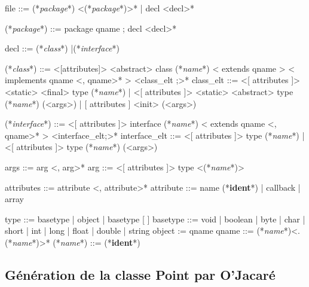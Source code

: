 \documentclass[a4paper, 11pt]{article}
\newcommand{\class}{\ttfamily\textit{class}}
\newcommand{\interface}{\ttfamily\textit{interface}}
\newcommand{\name}{\ttfamily\textit{name}}
\newcommand{\package}{\ttfamily\textit{package}}
\newcommand{\ident}{\footnotesize\textbf{ident}}
\begin{document}
\begin{idl}
file ::= (*\package*) <(*\package*)>*
  	| decl <decl>*
 
(*\package*) ::= package qname ; decl <decl>*

decl ::= (*\class*)
  	|(*\interface*)
 
(*\class*) ::= <[attributes]> <abstract> class (*\name*)
  	  < extends qname >
  	  < implements qname <, qname>* >
  	  { <class_elt ;>* }
class_elt ::= <[ attributes ]> <static> <final> type (*\name*)
            | <[ attributes ]> <static> <abstract> type (*\name*) (<args>)
            | [ attributes ] <init> (<args>)
 
(*\interface*) ::= <[ attributes ]> interface (*\name*)
  	       < extends qname <, qname>* >
  	      { <interface_elt;>* }
interface_elt ::= 
     <[ attributes ]> type (*\name*)
   | <[ attributes ]> type (*\name*) (<args>)
 
args ::= arg <, arg>*
arg ::= <[ attributes ]> type <(*\name*)>
 
attributes ::= 	attribute <, attribute>*
attribute ::= name (*\ident*)
  	    | callback
  	    | array
 
type ::= basetype
       | object
       | basetype [ ]
basetype ::= void
           | boolean
           | byte
           | char
           | short
           | int
           | long
           | float
           | double
           | string
object := qname
qname ::= (*\name*)<.(*\name*)>*
(*\name*) ::= (*\ident*)
\end{idl}

\newpage
\subsection{Génération de la classe Point par O'Jacaré}
\end{document}
